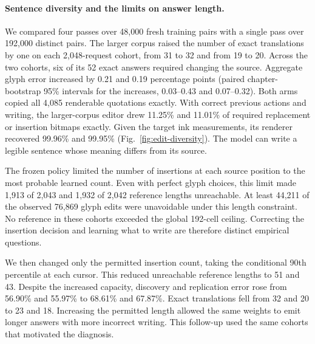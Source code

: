 \documentclass[12pt,a4paper]{article}
\providecommand{\DIFadd}[1]{{\protect\color{blue} \sf #1}} %
\begin{document}
\paragraph{\DIFadd{Sentence diversity and the limits on answer length.}}
\DIFadd{We compared four passes over 48,000 fresh training pairs with a single pass over 192,000 distinct pairs. The larger corpus raised the number of exact translations by one on each 2,048-request cohort, from 31 to 32 and from 19 to 20. Across the two cohorts, six of its 52 exact answers required changing the source. Aggregate glyph error increased by 0.21 and 0.19 percentage points (paired chapter-bootstrap 95\% intervals for the increases, 0.03--0.43 and 0.07--0.32). Both arms copied all 4,085 renderable quotations exactly. With correct previous actions and writing, the larger-corpus editor drew 11.25\% and 11.01\% of required replacement or insertion bitmaps exactly. Given the target ink measurements, its renderer recovered 99.96\% and 99.95\% (Fig.~\ref{fig:edit-diversity}). The model can write a legible sentence whose meaning differs from its source.
}

\DIFadd{The frozen policy limited the number of insertions at each source position to the most probable learned count. Even with perfect glyph choices, this limit made 1,913 of 2,043 and 1,932 of 2,042 reference lengths unreachable. At least 44,211 of the observed 76,869 glyph edits were unavoidable under this length constraint. No reference in these cohorts exceeded the global 192-cell ceiling. Correcting the insertion decision and learning what to write are therefore distinct empirical questions.
}

\DIFadd{We then changed only the permitted insertion count, taking the conditional 90th percentile at each cursor. This reduced unreachable reference lengths to 51 and 43. Despite the increased capacity, discovery and replication error rose from 56.90\% and 55.97\% to 68.61\% and 67.87\%. Exact translations fell from 32 and 20 to 23 and 18. Increasing the permitted length allowed the same weights to emit longer answers with more incorrect writing. This follow-up used the same cohorts that motivated the diagnosis.
}
\end{document}
